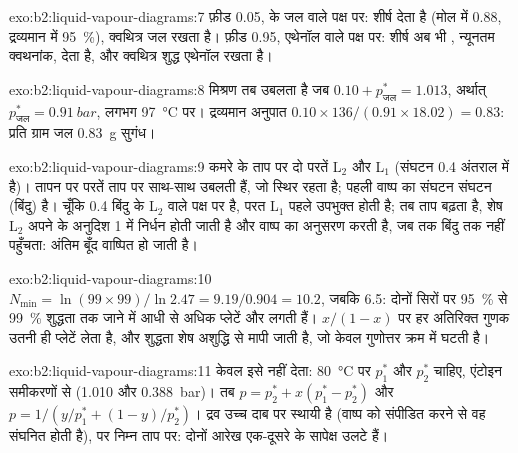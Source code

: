 \begin{solution}{exo:b2:liquid-vapour-diagrams:7}
फ़ीड 0.05,  के जल वाले पक्ष पर: शीर्ष  देता है
(मोल में 0.88, द्रव्यमान में 95~\%), क्वथित्र जल रखता है। फ़ीड 0.95,
एथेनॉल वाले पक्ष पर: शीर्ष अब भी , न्यूनतम क्वथनांक, देता है,
और क्वथित्र शुद्ध एथेनॉल रखता है।
\end{solution}

\begin{solution}{exo:b2:liquid-vapour-diagrams:8}
मिश्रण तब उबलता है जब $0.10 + p^*_{\text{जल}} = 1.013$, अर्थात्
$p^*_{\text{जल}} = \qty{0.91}{bar}$, लगभग \qty{97}{\degreeCelsius} पर। द्रव्यमान अनुपात
$0.10 \times 136/(0.91 \times 18.02) = 0.83$: प्रति ग्राम जल \qty{0.83}{g}
सुगंध।
\end{solution}

\begin{solution}{exo:b2:liquid-vapour-diagrams:9}
कमरे के ताप पर दो परतें L$_2$ और L$_1$ (संघटन 0.4 अंतराल में
है)। तापन पर परतें  ताप पर साथ-साथ उबलती हैं,
जो स्थिर रहता है; पहली वाष्प का संघटन 
संघटन (बिंदु) है। चूँकि 0.4 बिंदु के L$_2$ वाले पक्ष पर है, परत
L$_1$ पहले उपभुक्त होती है; तब ताप बढ़ता है, शेष L$_2$ अपने  के
अनुदिश 1 में निर्धन होती जाती है और वाष्प  का अनुसरण करती है, जब तक
बिंदु  तक नहीं पहुँचता: अंतिम बूँद वाष्पित हो जाती है।
\end{solution}

\begin{solution}{exo:b2:liquid-vapour-diagrams:10}
$N_{\min} = \ln(99 \times 99)/\ln 2.47 = 9.19/0.904 = 10.2$, जबकि 6.5: दोनों सिरों पर
95~\% से 99~\% शुद्धता तक जाने में आधी से अधिक प्लेटें और
लगती हैं। $x/(1 - x)$ पर हर अतिरिक्त गुणक उतनी ही प्लेटें लेता है, और
शुद्धता शेष अशुद्धि से मापी जाती है, जो केवल गुणोत्तर क्रम में घटती है।
\end{solution}

\begin{solution}{exo:b2:liquid-vapour-diagrams:11}
केवल  इसे नहीं देता: \qty{80}{\degreeCelsius} पर $p_1^*$ और $p_2^*$
चाहिए, एंटोइन समीकरणों से (1.010 और
\qty{0.388}{bar})। तब $p = p_2^* + x(p_1^* - p_2^*)$ और $p = 1/(y/p_1^* + (1 -
y)/p_2^*)$। द्रव उच्च दाब पर स्थायी है (वाष्प को संपीडित करने से वह
संघनित होती है),  पर निम्न ताप पर: दोनों आरेख
एक-दूसरे के सापेक्ष उलटे हैं।
\end{solution}

